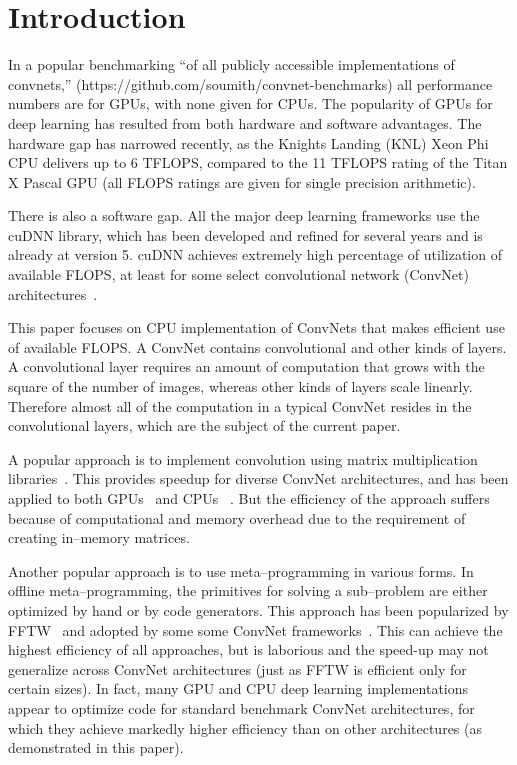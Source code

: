 \section{Introduction}

  In a popular benchmarking ``of all publicly accessible
  implementations of convnets,''
  (https://github.com/soumith/convnet-benchmarks) all performance
  numbers are for GPUs, with none given for CPUs.  The popularity of
  GPUs for deep learning has resulted from both hardware and software
  advantages.  The hardware gap has narrowed recently, as the Knights
  Landing (KNL) Xeon Phi CPU delivers up to 6 TFLOPS, compared to the
  11 TFLOPS rating of the Titan X Pascal GPU (all FLOPS ratings are
  given for single precision arithmetic).

  There is also a software gap.  All the major deep learning
  frameworks use the cuDNN library, which has been developed and
  refined for several years and is already at version 5.  cuDNN
  achieves extremely high percentage of utilization of available
  FLOPS, at least for some select convolutional network (ConvNet)
  architectures~\cite{imagenetwinners}.

  This paper focuses on CPU implementation of ConvNets that makes
  efficient use of available FLOPS.  A ConvNet contains convolutional
  and other kinds of layers.  A convolutional layer requires an amount
  of computation that grows with the square of the number of 
  images, whereas other kinds of layers scale linearly.  Therefore
  almost all of the computation in a typical ConvNet resides in the
  convolutional layers, which are the subject of the current paper.

  A popular approach is to implement convolution using
  matrix multiplication
  libraries~\cite{chellapilla2006high}.  This provides speedup for
  diverse ConvNet architectures, and has been applied to both
  GPUs~\cite{chetlur2014cudnn,neonnervana} and CPUs
  ~\cite{hadjis2015shallow}.  But the efficiency of the approach
  suffers because of computational and memory overhead due to the
  requirement of creating in--memory matrices.

  Another popular approach is to use meta--programming in various
  forms.  In offline meta--programming, the
  primitives for solving a sub--problem are either optimized
  by hand or by code generators.  This approach has been popularized
  by FFTW~\cite{frigo1998fftw,frigo1999fftw} and adopted by some some
  ConvNet frameworks~\cite{klockner2012pycuda,nervanagpu}.  This can
  achieve the highest efficiency of all approaches, but is
  laborious and the speed-up may not generalize across ConvNet architectures
  (just as FFTW is efficient only
  for certain sizes).  In fact, many GPU and CPU deep learning
  implementations appear to optimize code for standard benchmark
  ConvNet architectures, for which they achieve markedly higher
  efficiency than on other architectures (as demonstrated in this paper).

